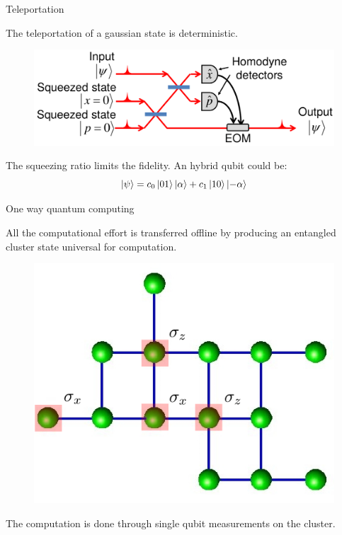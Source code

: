 \documentclass{beamer}
\begin{document}
\begin{frame}{Teleportation}
\begin{center}
The teleportation of a gaussian state is deterministic.

\begin{figure}[!htb]
\centering
\includegraphics[scale=.25]{immagini/cv.png}
\end{figure}


The squeezing ratio limits the fidelity. An hybrid qubit could be:
\begin{equation*}
\ket{\psi} = c_0 \ket{01} \ket{\alpha} + c_1 \ket{10} \ket{-\alpha}
\end{equation*}

\end{center}
\end{frame}

\begin{frame}{One way quantum computing}
\begin{center}
All the computational effort is transferred offline by producing an entangled cluster state universal for computation.

\begin{figure}[!htb]
\centering
\includegraphics[scale=.4]{immagini/cluster2.png}
\end{figure}

The computation is done through single qubit measurements on the cluster.

\end{center}
\end{frame}
\end{document}
